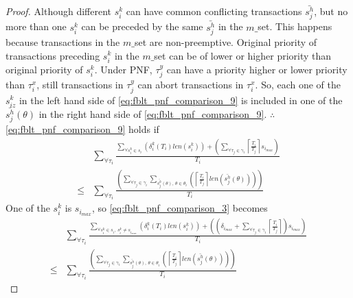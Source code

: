 \documentclass[12pt,english]{report}
\newtheorem{proof}{Proof}
\begin{document}
\begin{proof}
Although different $s_{i}^{k}$ can have common conflicting transactions
$\bar{s_{j}^{h}}$, but no more than one $s_{i}^{k}$ can be preceded
by the same $\bar{s_{j}^{h}}$ in the $m\_$set. This happens because
transactions in the $m\_$set are non-preemptive. Original priority
of transactions preceding $s_{i}^{k}$ in the $m\_$set can be of
lower or higher priority than original priority of $s_{i}^{k}$. Under
PNF, $\tau_{j}^{y}$ can have a priority higher or lower priority
than $\tau_{i}^{x}$, still transactions in $\tau_{j}^{y}$ can abort
transactions in $\tau_{i}^{x}$. So, each one of the $s_{iz}^{k}$
in the left hand side of \ref{eq:fblt_pnf_comparison_9} is included
in one of the $\bar{s_{j}^{h}}(\theta)$ in the right hand side of
\ref{eq:fblt_pnf_comparison_9}. $\therefore$ \ref{eq:fblt_pnf_comparison_9}
holds if 
\begin{eqnarray}
 & \sum_{\forall\tau_{i}}\frac{\sum_{\forall s_{i}^{k}\in s_{i}}\left(\delta_{i}^{k}(T_{i})len(s_{i}^{k})\right)+\left(\sum_{\forall\tau_{j}\in\gamma_{i}}\left\lceil \frac{T_{i}}{T_{j}}\right\rceil s_{i_{max}}\right)}{T_{i}}\label{eq:fblt_pnf_comparison_3}\\
\le & \sum_{\forall\tau_{i}}\frac{\left(\sum_{\forall\tau_{j}\in\gamma_{i}}\sum_{\bar{s_{j}^{h}}(\theta),\,\theta\in\theta_{i}}\left(\left\lceil \frac{T_{i}}{T_{j}}\right\rceil len\left(\bar{s_{j}^{h}}(\theta)\right)\right)\right)}{T_{i}}\nonumber 
\end{eqnarray}
One of the $s_{i}^{k}$ is $s_{i_{max}}$, so \ref{eq:fblt_pnf_comparison_3}
becomes 
\begin{eqnarray}
 & \sum_{\forall\tau_{i}}\frac{\sum_{\forall s_{i}^{k}\in s_{i},\, s_{i}^{k}\ne s_{i_{max}}}\left(\delta_{i}^{k}(T_{i})len(s_{i}^{k})\right)+\left(\left(\delta_{i_{max}}+\sum_{\forall\tau_{j}\in\gamma_{i}}\left\lceil \frac{T_{i}}{T_{j}}\right\rceil \right)s_{i_{max}}\right)}{T_{i}}\label{eq:fblt_pnf_comparison_10}\\
\le & \sum_{\forall\tau_{i}}\frac{\left(\sum_{\forall\tau_{j}\in\gamma_{i}}\sum_{\bar{s_{j}^{h}}(\theta),\,\theta\in\theta_{i}}\left(\left\lceil \frac{T_{i}}{T_{j}}\right\rceil len\left(\bar{s_{j}^{h}}(\theta)\right)\right)\right)}{T_{i}}\nonumber 
\end{eqnarray}



\end{proof}
\end{document}
